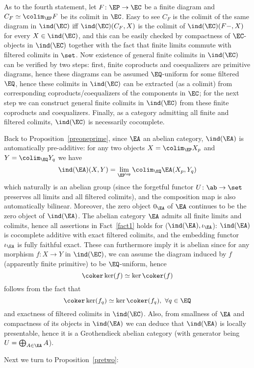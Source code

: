 \documentclass[twoside]{article}
\begin{document}
As to the fourth statement, let $F\colon \EP \rightarrow \EC$ be a finite diagram and $C_F \simeq \colim_\EP F$ be its colimit in $\EC$. Easy to see $C_F$ is the colimit of the same diagram in $\ind(\EC)$ iff $\ind(\EC)(C_F, X)$ is the colimit of $\ind(\EC)(F-,X)$ for every $X \in \ind(\EC)$, and this can be easily checked by compactness of $\EC$-objects in $\ind(\EC)$ together with the fact that finite limits commute with filtered colimits in $\set$. Now existence of general finite colimits in $\ind(\EC)$ can be verified by two steps: first, finite coproducts and coequalizers are primitive diagrams, hence these diagrams can be assumed $\EQ$-uniform for some filtered $\EQ$, hence these colimits in $\ind(\EC)$ can be extracted (as a colimit) from corresponding coproducts/coequalizers of the components in $\EC$; for the next step we can construct general finite colimits in $\ind(\EC)$ from these finite coproducts and coequalizers. Finally, as a category admitting all finite and filtered colimits, $\ind(\EC)$ is necessarily cocomplete.
\epf

Back to Proposition~\ref{preoneprime}, since $\EA$ an abelian category, $\ind(\EA)$ is automatically pre-additive: for any two objects $X = \colim_\EP X_p$ and $Y = \colim_\EQ Y_q$ we have
$$\ind(\EA) (X, Y) = \lim_{\EP^\op} \colim_\EQ \EA(X_p, Y_q)$$
which naturally is an abelian group (since the forgetful functor $U\colon \ab \rightarrow \set$ preserves all limits and all filtered colimits), and the composition map is also automatically bilinear. Moreover, the zero object $0_\EA$ of $\EA$ continues to be the zero object of $\ind(\EA)$. The abelian category $\EA$ admits all finite limits and colimits, hence all assertions in Fact~\ref{fact1} holds for ($\ind(\EA), \iota_\EA$): $\ind(\EA)$ is cocomplete additive with exact filtered colimits, and the embedding functor $\iota_\EA$ is fully faithful exact. These can  furthermore imply it is abelian since for any morphism $f\colon X \rightarrow Y$ in $\ind(\EC)$, we can assume the diagram induced by $f$ (apparently finite primitive) to be $\EQ$-uniform, hence 
$$\coker \ker (f) \simeq \ker \coker (f)$$ 
follows from the fact that 
$$\coker \ker (f_q) \simeq \ker \coker (f_q), \ \forall q \in \EQ$$
and exactness of filtered colimits in $\ind(\EC)$. Also, from smallness of $\EA$ and compactness of its objects in $\ind(\EA)$ we can deduce that $\ind(\EA)$ is locally presentable, hence it is a Grothendieck abelian category (with generator being $U = \bigoplus_{A \in \EA} A$).
\epf

Next we turn to Proposition~\ref{pretwo}: 
\end{document}
